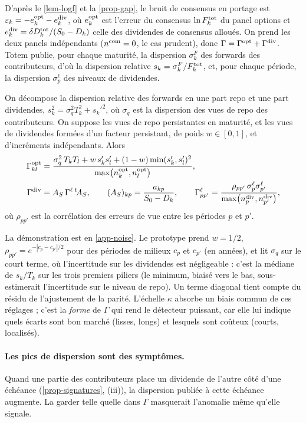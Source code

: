 D'après le \cref{lem-logf} et la \cref{prop-gap}, le bruit de consensus en portage est $\varepsilon_k=-e^{\mathrm{opt}}_k-
e^{\mathrm{div}}_k$, où $e^{\mathrm{opt}}_k$ est l'erreur du consensus $\ln F^{\mathrm{tot}}_k$ du panel options et
$e^{\mathrm{div}}_k=\delta D^{\mathrm{tot}}_k/(S_0-D_k)$ celle des dividendes de consensus alloués. On prend les deux panels
indépendants ($n^{\mathrm{com}}=0$, le cas prudent), donc $\Gamma=\Gamma^{\mathrm{opt}}+\Gamma^{\mathrm{div}}$. Totem publie, pour chaque
maturité, la dispersion $\sigma^F_k$ des forwards des contributeurs, d'où la dispersion relative $s_k=\sigma^F_k/F^{\mathrm{tot}}_k$,
et, pour chaque période, la dispersion $\sigma^\ell_p$ des niveaux de dividendes.

\begin{proposition}\label{prop-noise}
On décompose la dispersion relative des forwards en une part repo et une part dividendes,
$s_k^2=\sigma_q^2T_k^2+s_k'^2$, où $\sigma_q$ est la dispersion des vues de repo des contributeurs. On suppose les vues
de repo persistantes en maturité, et les vues de dividendes formées d'un facteur persistant, de poids $w\in[0,1]$, et
d'incréments indépendants. Alors
\begin{align}
\Gamma^{\mathrm{opt}}_{kl}&=\frac{\sigma_q^2\,T_kT_l+w\,s'_ks'_l+(1-w)\min(s'_k, s'_l)^2}{\max\bigl(n^{\mathrm{opt}}_k, n^{\mathrm{opt}}_l\bigr)},
\label{eq-gamma-opt}\\
\Gamma^{\mathrm{div}}&=A_S\,\Gamma^\ell\,{}^{t}\!A_S, \qquad(A_S)_{kp}=\frac{a_{kp}}{S_0-D_k}, \qquad
\Gamma^\ell_{pp'}=\frac{\rho_{pp'}\,\sigma^\ell_p\sigma^\ell_{p'}}{\max\bigl(n^{\mathrm{div}}_p, n^{\mathrm{div}}_{p'}\bigr)} ,
\label{eq-gamma-div}
\end{align}
où $\rho_{pp'}$ est la corrélation des erreurs de vue entre les périodes $p$ et $p'$.
\end{proposition}
La démonstration est en \cref{app-noise}. Le prototype prend $w=1/2$, $\rho_{pp'}=e^{-|c_p-c_{p'}|/2}$ pour des périodes
de milieux $c_p$ et $c_{p'}$ (en années), et lit $\sigma_q$ sur le court terme, où l'incertitude sur les dividendes est
négligeable : c'est la médiane de $s_k/T_k$ sur les trois premiers piliers (le minimum, biaisé vers le bas,
sous-estimerait l'incertitude sur le niveau de repo). Un terme diagonal tient compte du résidu de l'ajustement de la
parité. L'échelle $\kappa$ absorbe un biais commun de ces réglages ; c'est la \emph{forme} de $\Gamma$ qui rend le
détecteur puissant, car elle lui indique quels écarts sont bon marché (lisses, longs) et lesquels sont coûteux (courts,
localisés).

\paragraph{Les pics de dispersion sont des symptômes.} Quand une partie des contributeurs place un dividende de l'autre
côté d'une échéance (\cref{prop-signatures}, (iii)), la dispersion publiée à cette échéance augmente. La garder telle
quelle dans $\Gamma$ masquerait l'anomalie même qu'elle signale.

